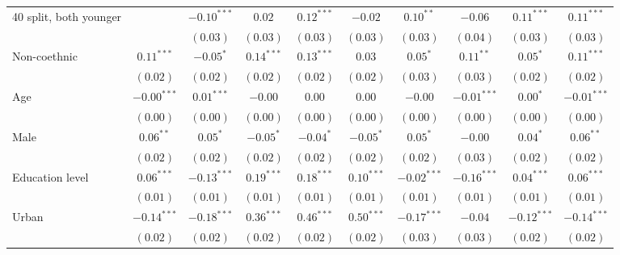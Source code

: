 \begin{table}
\begin{center}
\begin{threeparttable}
\begin{tabular}{l c c c c c c c c c}
40 split, both younger          &               & $-0.10^{***}$ & $0.02$        & $0.12^{***}$  & $-0.02$       & $0.10^{**}$   & $-0.06$       & $0.11^{***}$  & $0.11^{***}$  \\
                                &               & $(0.03)$      & $(0.03)$      & $(0.03)$      & $(0.03)$      & $(0.03)$      & $(0.04)$      & $(0.03)$      & $(0.03)$      \\
Non-coethnic                    & $0.11^{***}$  & $-0.05^{*}$   & $0.14^{***}$  & $0.13^{***}$  & $0.03$        & $0.05^{*}$    & $0.11^{**}$   & $0.05^{*}$    & $0.11^{***}$  \\
                                & $(0.02)$      & $(0.02)$      & $(0.02)$      & $(0.02)$      & $(0.02)$      & $(0.03)$      & $(0.03)$      & $(0.02)$      & $(0.02)$      \\
Age                             & $-0.00^{***}$ & $0.01^{***}$  & $-0.00$       & $0.00$        & $0.00$        & $-0.00$       & $-0.01^{***}$ & $0.00^{*}$    & $-0.01^{***}$ \\
                                & $(0.00)$      & $(0.00)$      & $(0.00)$      & $(0.00)$      & $(0.00)$      & $(0.00)$      & $(0.00)$      & $(0.00)$      & $(0.00)$      \\
Male                            & $0.06^{**}$   & $0.05^{*}$    & $-0.05^{*}$   & $-0.04^{*}$   & $-0.05^{*}$   & $0.05^{*}$    & $-0.00$       & $0.04^{*}$    & $0.06^{**}$   \\
                                & $(0.02)$      & $(0.02)$      & $(0.02)$      & $(0.02)$      & $(0.02)$      & $(0.02)$      & $(0.03)$      & $(0.02)$      & $(0.02)$      \\
Education level                 & $0.06^{***}$  & $-0.13^{***}$ & $0.19^{***}$  & $0.18^{***}$  & $0.10^{***}$  & $-0.02^{***}$ & $-0.16^{***}$ & $0.04^{***}$  & $0.06^{***}$  \\
                                & $(0.01)$      & $(0.01)$      & $(0.01)$      & $(0.01)$      & $(0.01)$      & $(0.01)$      & $(0.01)$      & $(0.01)$      & $(0.01)$      \\
Urban                           & $-0.14^{***}$ & $-0.18^{***}$ & $0.36^{***}$  & $0.46^{***}$  & $0.50^{***}$  & $-0.17^{***}$ & $-0.04$       & $-0.12^{***}$ & $-0.14^{***}$ \\
                                & $(0.02)$      & $(0.02)$      & $(0.02)$      & $(0.02)$      & $(0.02)$      & $(0.03)$      & $(0.03)$      & $(0.02)$      & $(0.02)$      \\

\end{tabular}
\end{threeparttable}
\end{center}
\end{table}
